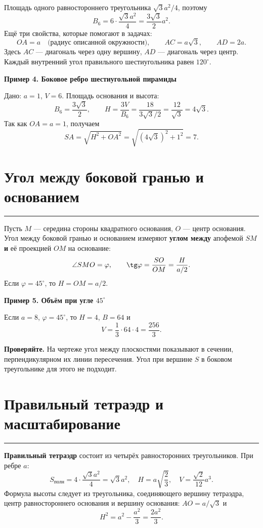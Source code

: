 \documentclass[a4paper,12pt]{article}
\newcommand{\sect}[1]{\section{#1}\vspace{-1.5mm}\noindent\color{accent}\rule{\linewidth}{0.45pt}\color{textgray}\vspace{2mm}}
\newcommand{\warning}[1]{\par\textcolor{darkaccent}{\textbf{Проверяйте.}} #1\par}
\newcommand{\ex}[1]{\par\medskip\noindent\textcolor{darkaccent}{\textbf{#1}}\par}
\begin{document}
\begin{center}
\end{center}
Площадь одного равностороннего треугольника \(\sqrt3 a^2/4\), поэтому
\[
\boxed{B_6=6\cdot\frac{\sqrt3a^2}{4}=\frac{3\sqrt3}{2}a^2}.
\]
Ещё три свойства, которые помогают в задачах:
\[
\boxed{OA=a}\quad\text{(радиус описанной окружности)},
\qquad \boxed{AC=a\sqrt3},\qquad \boxed{AD=2a}.
\]
Здесь \(AC\) --- диагональ через одну вершину, \(AD\) --- диагональ через центр.
Каждый внутренний угол правильного шестиугольника равен \(120^\circ\).

\ex{Пример 4. Боковое ребро шестиугольной пирамиды}
Дано: \(a=1\), \(V=6\). Площадь основания и высота:
\[
B_6=\frac{3\sqrt3}{2},\qquad
H=\frac{3V}{B_6}=\frac{18}{3\sqrt3/2}=\frac{12}{\sqrt3}=4\sqrt3.
\]
Так как \(OA=a=1\), получаем
\[
SA=\sqrt{H^2+OA^2}=\sqrt{(4\sqrt3)^2+1^2}=\boxed{7}.
\]

\sect{Угол между боковой гранью и основанием}
Пусть \(M\) --- середина стороны квадратного основания, \(O\) --- центр основания. Угол между боковой гранью и основанием измеряют \textbf{углом между} апофемой \(SM\) \textbf{и} её проекцией \(OM\) на основание:
\[
\angle SMO=\varphi,\qquad \tg\varphi=\frac{SO}{OM}=\frac{H}{a/2}.
\]
Если \(\varphi=45^\circ\), то \(H=OM=a/2\).

\ex{Пример 5. Объём при угле \(45^\circ\)}
Если \(a=8\), \(\varphi=45^\circ\), то \(H=4\), \(B=64\) и
\[
\boxed{V=\frac13\cdot64\cdot4=\frac{256}{3}}.
\]
\warning{На чертеже угол между плоскостями показывают в сечении, перпендикулярном их линии пересечения. Угол при вершине \(S\) в боковом треугольнике для этого не подходит.}

\sect{Правильный тетраэдр и масштабирование}
\textbf{Правильный тетраэдр} состоит из четырёх равносторонних треугольников. При ребре \(a\):
\[
\boxed{S_{\text{полн}}=4\cdot\frac{\sqrt3a^2}{4}=\sqrt3a^2},
\quad
H=a\sqrt{\frac23},\quad
\boxed{V=\frac{\sqrt2}{12}a^3}.
\]
Формула высоты следует из треугольника, соединяющего вершину тетраэдра, центр равностороннего основания и вершину основания: \(AO=a/\sqrt3\) и
\[
H^2=a^2-\frac{a^2}{3}=\frac{2a^2}{3}.
\]
\end{document}
